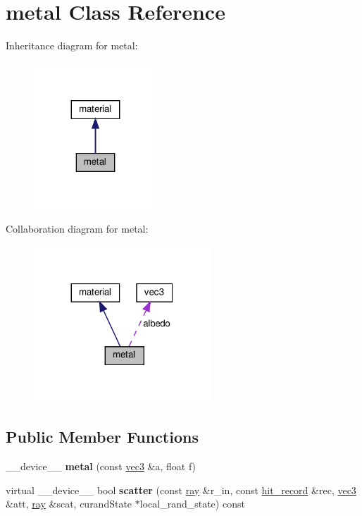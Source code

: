 \hypertarget{classmetal}{}\section{metal Class Reference}
\label{classmetal}


Inheritance diagram for metal\+:
\nopagebreak
\begin{figure}[H]
\begin{center}
\leavevmode
\includegraphics[width=131pt]{classmetal__inherit__graph}
\end{center}
\end{figure}


Collaboration diagram for metal\+:
\nopagebreak
\begin{figure}[H]
\begin{center}
\leavevmode
\includegraphics[width=188pt]{classmetal__coll__graph}
\end{center}
\end{figure}
\subsection*{Public Member Functions}
\begin{DoxyCompactItemize}
\item 
\mbox{\label{classmetal_aa515b7c51fdaed02076e817ad37bc271}} 
\+\_\+\+\_\+device\+\_\+\+\_\+ {\bfseries metal} (const \hyperlink{classvec3}{vec3} \&a, float f)
\item 
\mbox{\label{classmetal_a4a662a452dafd2124280a16cfbc333f1}} 
virtual \+\_\+\+\_\+device\+\_\+\+\_\+ bool {\bfseries scatter} (const \hyperlink{classray}{ray} \&r\+\_\+in, const \hyperlink{structhit__record}{hit\+\_\+record} \&rec, \hyperlink{classvec3}{vec3} \&att, \hyperlink{classray}{ray} \&scat, curand\+State $\ast$local\+\_\+rand\+\_\+state) const
\end{DoxyCompactItemize}

